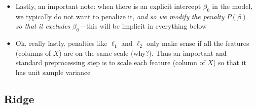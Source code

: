 \documentclass{article}
\begin{document}
\begin{itemize}
\item Lastly, an important note: when there is an explicit intercept $\beta_0$
  in the model, we typically do not want to penalize it, \emph{and so we modify
    the penalty $P(\beta)$ so that it excludes $\beta_0$}---this will be
  implicit in everything below 

\item Ok, really lastly, penalties like $\ell_1$ and $\ell_2$ only make sense if
  all the features (columns of $X$) are on the same scale (why?). Thus an 
  important and standard preprocessing step is to scale each feature (column of
  $X$) so that it has unit sample variance 
\end{itemize}

\subsection{Ridge}
\end{document}
